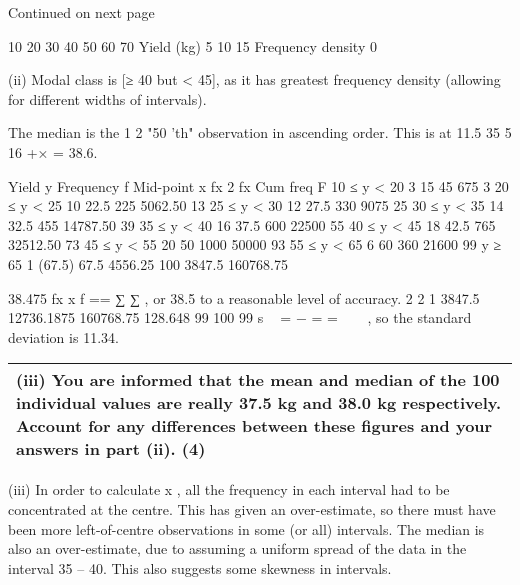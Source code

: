 \documentclass[a4paper,12pt]{article}
\begin{document}
Continued on next page 
 
10 20 30 40 50 60 70
Yield (kg) 
5 
10 
15 
Frequency density 
0 

 
 
(ii) Modal class is [≥ 40 but < 45], as it has greatest frequency density (allowing for different widths of intervals). 
 
The median is the 1 2 "50 'th" observation in ascending order. This is at 11.5 35 5 16 +× = 38.6. 
 
Yield y 
Frequency f 
Mid-point x 
fx 2 fx Cum freq F 
10 ≤ y < 20 3 15 45 675 3 
20 ≤ y < 25 10 22.5 225 5062.50 13 
25 ≤ y < 30 12 27.5 330 9075 25 
30 ≤ y < 35 14 32.5 455 14787.50 39 
35 ≤ y < 40 16 37.5 600 22500 55 
40 ≤ y < 45 18 42.5 765 32512.50 73 
45 ≤ y < 55 20 50 1000 50000 93 
55 ≤ y < 65 6 60 360 21600 99 
y ≥ 65 1 (67.5) 67.5 4556.25 100    
3847.5 160768.75  
 
 
38.475
fx
x
f == ∑ ∑ , or 38.5 to a reasonable level of accuracy. 2 2 1 3847.5 12736.1875 160768.75 128.648 99 100 99
s
 = − = =   , so the standard deviation is 11.34. 
 
 
 
\newpage
\begin{table}[ht!]
 
\centering
 
\begin{tabular}{|p{15cm}|}
 
\hline  

 (iii) You are informed that the mean and median of the 100 individual values are really 37.5 kg and 38.0 kg respectively.  Account for any differences between these figures and your answers in part (ii). (4) 

\\ \hline
  
\end{tabular}

\end{table}

 
(iii) In order to calculate x , all the frequency in each interval had to be concentrated at the centre.  This has given an over-estimate, so there must have been more left-of-centre observations in some (or all) intervals.  The median is also an over-estimate, due to assuming a uniform spread of the data in the interval 35 – 40.  This also suggests some skewness in intervals. 
\end{document}
